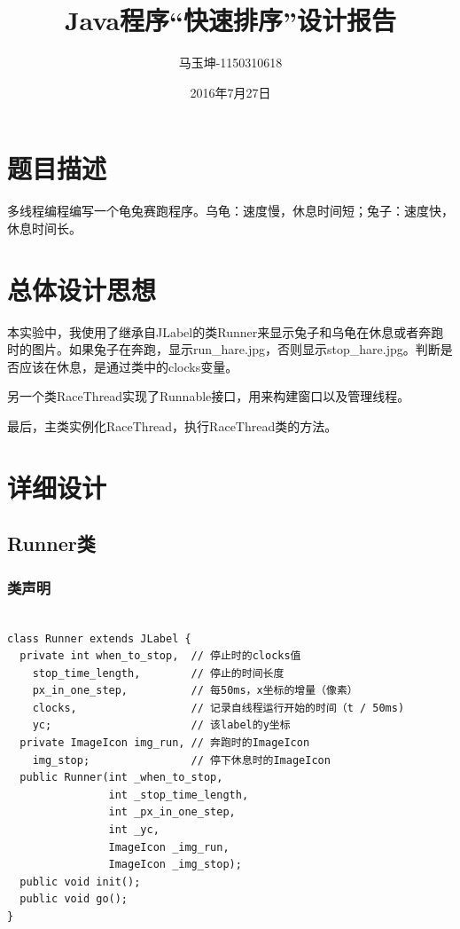 \documentclass[11pt, a4paper]{article}
\begin{document}
\begin{CJK*}{UTF8}{gbsn}
  \title{\bf Java程序“快速排序”设计报告}
  \author{马玉坤-1150310618}
  \date{2016年7月27日}
  \maketitle
  \renewcommand{\contentsname}{\textbf{目录}}
  \tableofcontents
  \newpage
  \newpage
  
  \section{题目描述}
  
  多线程编程编写一个龟兔赛跑程序。乌龟：速度慢，休息时间短；兔子：速度快，休息时间长。

  \section{总体设计思想}

  本实验中，我使用了继承自JLabel的类Runner来显示兔子和乌龟在休息或者奔跑时的图片。如果兔子在奔跑，显示run\_hare.jpg，否则显示stop\_hare.jpg。判断是否应该在休息，是通过类中的clocks变量。

  另一个类RaceThread实现了Runnable接口，用来构建窗口以及管理线程。

  最后，主类实例化RaceThread，执行RaceThread类的方法。

  \section{详细设计}

  \subsection{Runner类}

  \subsubsection{类声明}

  \begin{lstlisting}

class Runner extends JLabel {
  private int when_to_stop,  // 停止时的clocks值
    stop_time_length,        // 停止的时间长度
    px_in_one_step,          // 每50ms，x坐标的增量（像素）
    clocks,                  // 记录自线程运行开始的时间（t / 50ms)
    yc;                      // 该label的y坐标
  private ImageIcon img_run, // 奔跑时的ImageIcon
    img_stop;                // 停下休息时的ImageIcon
  public Runner(int _when_to_stop,
                int _stop_time_length,
                int _px_in_one_step,
                int _yc,
                ImageIcon _img_run,
                ImageIcon _img_stop);
  public void init();
  public void go();
}
    

\end{lstlisting}
\end{CJK*}
\end{document}
